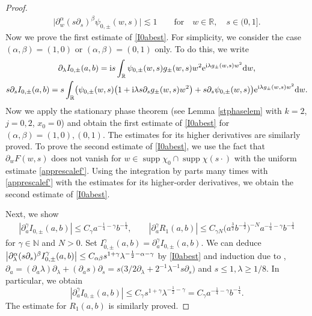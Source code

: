 \documentclass[10pt,a4paper]{amsart}
\numberwithin{equation}{section}
\def\R{\mathbb{R}}%
\DeclareMathOperator{\supp}{supp}%
\def\a{\alpha}
\def\b{\beta}
\def\c{\gamma}
\def\g{\psi}
\def\l{\lambda}
\def\pa{\partial}
\begin{document}
\begin{proof}
\begin{align*}
\big|\pa_w^{\a}(s\pa_s)^{\b}\g_{0,\pm}(w,s)\big|\lesssim 1\qquad \text{for}\quad w\in\R,\quad s\in (0,1].
\end{align*}
Now we prove the first estimate of \eqref{I0abest}. For simplicity, we consider the case $(\a,\b)=(1,0)$ or $(\a,\b)=(0,1)$ only. To do this, we write
\begin{gather*}
\pa_{\l}I_{0,\pm}(a,b)={\rm i}s\int_{\R}\g_{0,\pm}(w,s)g_{\pm}(w,s)w^2{\rm e}^{{\rm i}\l g_{\pm}(w,s)w^2}{\rm d}w,\\
s\pa_{s}I_{0,\pm}(a,b)=s\int_{\R}\bigl(\g_{0,\pm}(w,s)\bigl(1+{\rm i}\l s\pa_sg_{\pm}(w,s) w^2\bigr) +s\pa_s\g_{0,\pm}(w,s) \bigr) {\rm e}^{{\rm i}\l g_{\pm}(w,s)w^2}{\rm d}w.
\end{gather*}
Now we apply the stationary phase theorem (see Lemma \ref{stphaselem} with $k=2$, $j=0,2$, $x_0=0$) and obtain the first estimate of \eqref{I0abest} for $(\a,\b)=(1,0), (0,1)$. The estimates for its higher derivatives are similarly proved. To prove the second estimate of \eqref{I0abest}, we use the fact that~${\pa_wF(w,s)}$ does not vanish for $w\in \supp \chi_0\cap \supp \chi(s\cdot )$ with the uniform estimate \eqref{apprescalef'}.
 Using the integration by parts many times with \eqref{apprescalef'} with the estimates for its higher-order derivatives, we obtain the second estimate of \eqref{I0abest}.

Next, we show
\begin{align}\label{appI_0ader}
|\pa_{a}^{\c}I_{0,\pm}(a,b)|\leq C_{\c}a^{-\frac{1}{4}-\c}b^{-\frac{1}{4}},\qquad |\pa_{a}^{\c}R_1(a,b)|\leq C_{\c N}\bigl(a^{\frac{3}{2}}b^{-\frac{1}{2}}\bigr)^{-N} a^{-\frac{1}{4}-\c}b^{-\frac{1}{4}}
\end{align}
for $\c\in\mathbb{N}$ and $N>0$.
Set $I_{0,\pm}^{\c}(a,b)=\pa_a^{\c}I_{0,\pm}(a,b)$. We can deduce $\big|\pa_{\l}^{\a}(s\pa_{s})^{\b}I_{0,\pm}^{\c}(a,b)\big|\leq \smash{C_{\a\b}s^{1+\c}\l^{-\frac{1}{2}-\a-\c}}$ by \eqref{I0abest} and induction due to \smash{$I_{0,\pm}^{\c+1}=\pa_aI_{0,\pm}^{\c}$}, $\pa_a= (\pa_a\l)\pa_{\l}+(\pa_as)\pa_s= s\bigl(3/2\pa_{\l}+2^{-1}\l^{-1}s \pa_s\bigr)$ and $s\leq 1, \l\geq 1/8$. In particular, we obtain
\[
|\pa_a^{\c}I_{0,\pm}(a,b)|\leq C_{\c}s^{1+\c}\l^{-\frac{1}{2}-\c}=C_{\c}a^{-\frac{1}{4}-\c}b^{-\frac{1}{4}}.
\]
 The estimate for $R_1(a,b)$ is similarly proved.


\end{proof}
\end{document}
